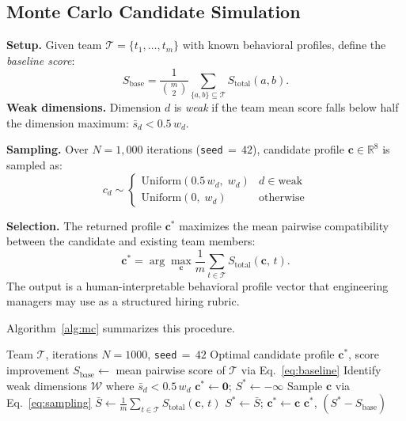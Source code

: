 \documentclass[conference]{IEEEtran}
\newcommand{\vect}[1]{\mathbf{#1}}
\newcommand{\set}[1]{\mathcal{#1}}
\begin{document}
\subsection{Monte Carlo Candidate Simulation}
\label{sec:montecarlo}

\textbf{Setup.}
Given team $\set{T} = \{t_1,\ldots,t_m\}$ with known behavioral
profiles, define the \emph{baseline score}:
\begin{equation}
  S_{\mathrm{base}} =
  \frac{1}{\binom{m}{2}}
  \sum_{\{a,b\}\subseteq\set{T}} S_{\mathrm{total}}(a,b).
  \label{eq:baseline}
\end{equation}
\textbf{Weak dimensions.}
Dimension $d$ is \emph{weak} if the team mean score falls below half
the dimension maximum: $\bar{s}_d < 0.5\,w_d$.

\textbf{Sampling.}
Over $N{=}1{,}000$ iterations (\texttt{seed}$\,{=}\,42$), candidate
profile $\vect{c} \in \mathbb{R}^8$ is sampled as:
\begin{equation}
  c_d \sim
  \begin{cases}
    \mathrm{Uniform}(0.5\,w_d,\;w_d) & d \in \text{weak} \\
    \mathrm{Uniform}(0,\;w_d)         & \text{otherwise}
  \end{cases}
  \label{eq:sampling}
\end{equation}

\textbf{Selection.}
The returned profile $\vect{c}^*$ maximizes the mean pairwise
compatibility between the candidate and existing team members:
\begin{equation}
  \vect{c}^* = \arg\max_{\vect{c}}
  \frac{1}{m}\sum_{t \in \set{T}} S_{\mathrm{total}}(\vect{c},\,t).
  \label{eq:mcselect}
\end{equation}
The output is a human-interpretable behavioral profile vector that
engineering managers may use as a structured hiring rubric.

Algorithm~\ref{alg:mc} summarizes this procedure.

\begin{algorithm}[t]
\caption{Monte Carlo Team-Complement Simulation}
\label{alg:mc}
\begin{algorithmic}[1]
  \Require Team $\set{T}$, iterations $N{=}1000$, \texttt{seed}$\,{=}\,42$
  \Ensure  Optimal candidate profile $\vect{c}^*$, score improvement
  \State $S_{\mathrm{base}} \leftarrow$ mean pairwise score of $\set{T}$
         via Eq.~\eqref{eq:baseline}
  \State Identify weak dimensions $\set{W}$ where $\bar{s}_d < 0.5\,w_d$
  \State $\vect{c}^* \leftarrow \mathbf{0}$;\;
         $S^* \leftarrow -\infty$
    \State Sample $\vect{c}$ via Eq.~\eqref{eq:sampling}
    \State $\bar{S} \leftarrow \frac{1}{m}\sum_{t \in \set{T}}
           S_{\mathrm{total}}(\vect{c},\,t)$
      \State $S^* \leftarrow \bar{S}$;\;
             $\vect{c}^* \leftarrow \vect{c}$
    \EndIf
  \EndFor
  \State \Return $\vect{c}^*$,\; $(S^* - S_{\mathrm{base}})$
\end{algorithmic}
\end{algorithm}
\end{document}
